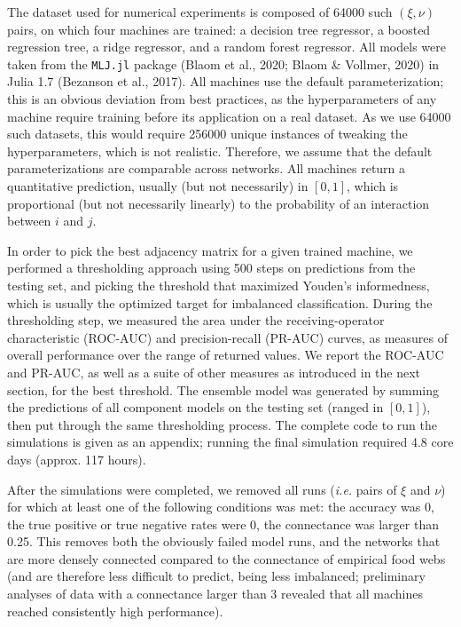 \documentclass[10pt,oneside]{article}
\begin{document}
The dataset used for numerical experiments is composed of 64000 such
\((\xi, \nu)\) pairs, on which four machines are trained: a decision
tree regressor, a boosted regression tree, a ridge regressor, and a
random forest regressor. All models were taken from the \texttt{MLJ.jl}
package (Blaom et al., 2020; Blaom \& Vollmer, 2020) in Julia 1.7
(Bezanson et al., 2017). All machines use the default parameterization;
this is an obvious deviation from best practices, as the hyperparameters
of any machine require training before its application on a real
dataset. As we use 64000 such datasets, this would require 256000 unique
instances of tweaking the hyperparameters, which is not realistic.
Therefore, we assume that the default parameterizations are comparable
across networks. All machines return a quantitative prediction, usually
(but not necessarily) in \([0,1]\), which is proportional (but not
necessarily linearly) to the probability of an interaction between \(i\)
and \(j\).

In order to pick the best adjacency matrix for a given trained machine,
we performed a thresholding approach using 500 steps on predictions from
the testing set, and picking the threshold that maximized Youden's
informedness, which is usually the optimized target for imbalanced
classification. During the thresholding step, we measured the area under
the receiving-operator characteristic (ROC-AUC) and precision-recall
(PR-AUC) curves, as measures of overall performance over the range of
returned values. We report the ROC-AUC and PR-AUC, as well as a suite of
other measures as introduced in the next section, for the best
threshold. The ensemble model was generated by summing the predictions
of all component models on the testing set (ranged in \([0,1]\)), then
put through the same thresholding process. The complete code to run the
simulations is given as an appendix; running the final simulation
required 4.8 core days (approx. 117 hours).

After the simulations were completed, we removed all runs (\emph{i.e.}
pairs of \(\xi\) and \(\nu\)) for which at least one of the following
conditions was met: the accuracy was 0, the true positive or true
negative rates were 0, the connectance was larger than 0.25. This
removes both the obviously failed model runs, and the networks that are
more densely connected compared to the connectance of empirical food
webs (and are therefore less difficult to predict, being less
imbalanced; preliminary analyses of data with a connectance larger than
3 revealed that all machines reached consistently high performance).
\end{document}
